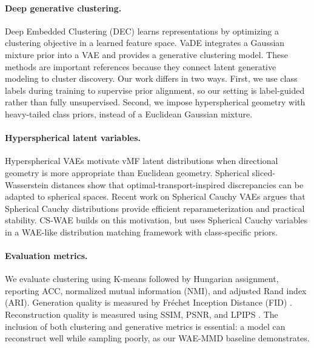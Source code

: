 \documentclass[10pt]{article}
\begin{document}
\paragraph{Deep generative clustering.}
Deep Embedded Clustering (DEC) \citep{xie2015unsupervised} learns representations by optimizing a clustering objective in a learned feature space. VaDE \citep{jiang2016variational} integrates a Gaussian mixture prior into a VAE and provides a generative clustering model. These methods are important references because they connect latent generative modeling to cluster discovery. Our work differs in two ways. First, we use class labels during training to supervise prior alignment, so our setting is label-guided rather than fully unsupervised. Second, we impose hyperspherical geometry with heavy-tailed class priors, instead of a Euclidean Gaussian mixture.

\paragraph{Hyperspherical latent variables.}
Hyperspherical VAEs \citep{davidson2018hyperspherical} motivate vMF latent distributions when directional geometry is more appropriate than Euclidean geometry. Spherical sliced-Wasserstein distances \citep{bonet2022spherical} show that optimal-transport-inspired discrepancies can be adapted to spherical spaces. Recent work on Spherical Cauchy VAEs \citep{sablica2025hyperspherical} argues that Spherical Cauchy distributions provide efficient reparameterization and practical stability. CS-WAE builds on this motivation, but uses Spherical Cauchy variables in a WAE-like distribution matching framework with class-specific priors.

\paragraph{Evaluation metrics.}
We evaluate clustering using K-means followed by Hungarian assignment, reporting ACC, normalized mutual information (NMI), and adjusted Rand index (ARI). Generation quality is measured by Fr\'echet Inception Distance (FID) \citep{heusel2017gans}. Reconstruction quality is measured using SSIM, PSNR, and LPIPS \citep{zhang2018unreasonable}. The inclusion of both clustering and generative metrics is essential: a model can reconstruct well while sampling poorly, as our WAE-MMD baseline demonstrates.
\end{document}
